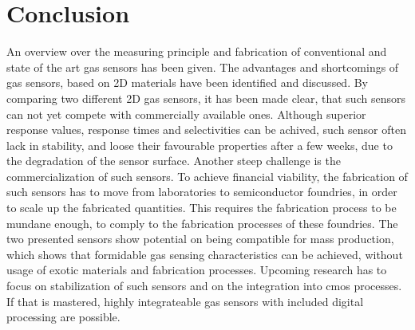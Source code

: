 \section{Conclusion}
\label{sec:conclusion}

An overview over the measuring principle and fabrication of conventional and state of the art gas sensors has been given. The advantages and shortcomings of gas sensors, based on 2D materials have been identified and discussed. By comparing two different 2D gas sensors, it has been made clear, that such sensors can not yet compete with commercially available ones. Although superior response values, response times and selectivities can be achived, such sensor often lack in stability, and loose their favourable properties after a few weeks, due to the degradation of the sensor surface. Another steep challenge is the commercialization of such sensors. To achieve financial viability, the fabrication of such sensors has to move from laboratories to semiconductor foundries, in order to scale up the fabricated quantities. This requires the fabrication process to be mundane enough, to comply to the fabrication processes of these foundries. The two presented sensors show potential on being compatible for mass production, which shows that formidable gas sensing characteristics can be achieved, without usage of exotic materials and fabrication processes. Upcoming research has to focus on stabilization of such sensors and on the integration into \gls{cmos} processes. If that is mastered, highly integrateable gas sensors with included digital processing are possible.
